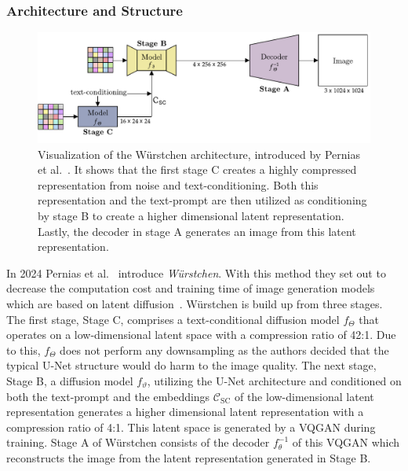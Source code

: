 \subsubsection{Architecture and Structure}
\begin{figure}[t]
    \includegraphics[width=\textwidth]{assets/wuerstchen_arch.pdf}
    \caption{Visualization of the W\"urstchen architecture, introduced by
        Pernias et al.~\cite{pernias2024wrstchen}. It shows that the first stage C
        creates a highly compressed representation from noise and text-conditioning.
        Both this representation and the text-prompt are then utilized as conditioning by stage B
        to create a higher dimensional latent representation. Lastly, the decoder
        in stage A generates an image from this latent representation.}
    \label{fig:wuerstchen:arch}
\end{figure}
In 2024 Pernias et al.~\cite{pernias2024wrstchen} introduce \emph{W\"urstchen}.
With this method they set out to decrease the computation cost and training
time of image generation models which are based on latent diffusion~\cite{rombach2022stablediffusion}.
W\"urstchen is build up from three stages. The first stage, Stage C, comprises
a text-conditional diffusion model $f_\Theta$ that operates on a
low-dimensional latent space with a compression ratio of 42:1. Due to this,
$f_\Theta$ does not perform any downsampling as the authors decided that the
typical U-Net structure would do harm to the image quality. The next stage,
Stage B, a diffusion model $f_\vartheta$, utilizing the U-Net architecture and
conditioned on both the text-prompt and the embeddings $\mathcal{C}_{\text{SC}}$
of the low-dimensional latent representation generates a higher dimensional
latent representation with a compression ratio of 4:1. This latent space is
generated by a VQGAN during training. Stage A of W\"urstchen consists of the decoder $f_\theta^{-1}$
of this VQGAN which reconstructs the image from the latent representation
generated in Stage B.

